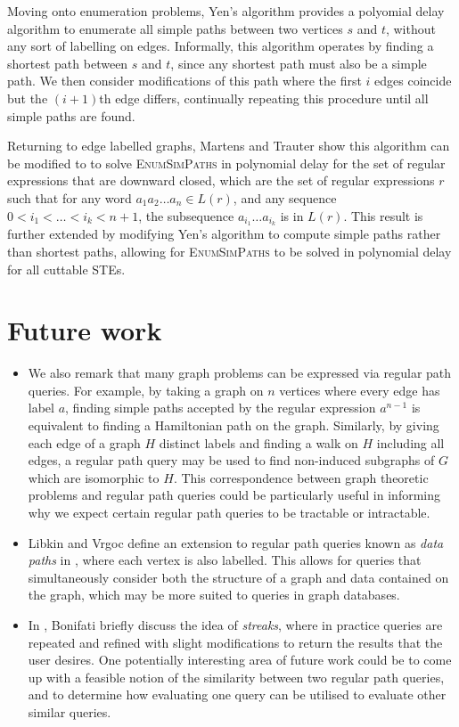 \documentclass{article}
\begin{document}
Moving onto enumeration problems, Yen's algorithm \cite{yenFindingShortestLoopless1971} provides a polyomial delay algorithm to enumerate all simple paths between two vertices $s$ and $t$, without any sort of labelling on edges. Informally, this algorithm operates by finding a shortest path between $s$ and $t$, since any shortest path must also be a simple path. We then consider modifications of this path where the first $i$ edges coincide but the $(i+1)$th edge differs, continually repeating this procedure until all simple paths are found.

Returning to edge labelled graphs, Martens and Trauter show this algorithm can be modified to to solve \textsc{EnumSimPaths} in polynomial delay for the set of regular expressions that are downward closed, which are the set of regular expressions $r$ such that for any word $a_1 a_2 \dots a_n \in L(r)$, and any sequence $0 < i_1 < \dots < i_k < n + 1$, the subsequence $a_{i_1} \dots a_{i_k}$ is in $L(r)$. This result is further extended by modifying Yen's algorithm to compute simple paths rather than shortest paths, allowing for \textsc{EnumSimPaths} to be solved in polynomial delay for all cuttable STEs.

\section{Future work}
\label{sec:future_work}

\begin{itemize}
    \item We also remark that many graph problems can be expressed via regular path queries. For example, by taking a graph on $n$ vertices where every edge has label $a$, finding simple paths accepted by the regular expression $a^{n-1}$ is equivalent to finding a Hamiltonian path on the graph. Similarly, by giving each edge of a graph $H$ distinct labels and finding a walk on $H$ including all edges, a regular path query may be used to find non-induced subgraphs of $G$ which are isomorphic to $H$. This correspondence between graph theoretic problems and regular path queries could be particularly useful in informing why we expect certain regular path queries to be tractable or intractable.
    \item Libkin and Vrgoc define an extension to regular path queries known as \emph{data paths} in \cite{libkinRegularPathQueries2012}, where each vertex is also labelled. This allows for queries that simultaneously consider both the structure of a graph and data contained on the graph, which may be more suited to queries in graph databases.
    \item In \cite{bonifatiAnalyticalStudyLarge2020}, Bonifati briefly discuss the idea of \emph{streaks}, where in practice queries are repeated and refined with slight modifications to return the results that the user desires. One potentially interesting area of future work could be to come up with a feasible notion of the similarity between two regular path queries, and to determine how evaluating one query can be utilised to evaluate other similar queries.

\end{itemize}



\end{document}
